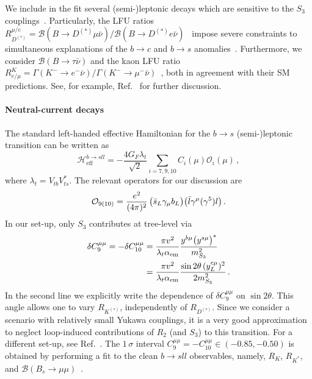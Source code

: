 \documentclass[aps,prd,superscriptaddress,twocolumn,secnumarabic]{revtex4-1}
\begin{document}
We include in the fit several (semi-)leptonic decays which are sensitive to the $S_3$ couplings~\cite{Dorsner:2017ufx}. Particularly, the LFU ratios $R_{D^{(\ast)}}^{\mu/e} = \mathcal{B}(B\to D^{(\ast)}\mu \bar{\nu})/\mathcal{B}(B\to D^{(\ast)} e \bar{\nu})$~\cite{Glattauer:2015teq,Abdesselam:2017kjf} impose severe constraints to simultaneous explanations of the $b\to c$ and $b\to s$ anomalies~\cite{Becirevic:2016oho}. Furthermore, we consider $\mathcal{B}(B\to \tau \bar{\nu})$ and the kaon LFU ratio $R^K_{e/\mu}= \Gamma(K^-\to e^- \bar{\nu})/\Gamma(K^-\to \mu^- \bar{\nu})$~\cite{Cirigliano:2007xi}, both in agreement with their SM predictions. See, for example, Ref.~\cite{Dorsner:2017ufx} for further discussion.

\paragraph*{Neutral-current decays} The standard left-handed effective Hamiltonian for the $b\to s$ (semi-)leptonic transition can be written as
\begin{equation}
\mathcal{H}^{b\to s l l}_{\mathrm{eff}} = -\dfrac{4 G_F \lambda_t }{\sqrt{2}}  \sum_{i=7,9,10} C_i(\mu)\mathcal{O}_i(\mu)\,,
\end{equation}
where $\lambda_t = V_{tb}V_{ts}^\ast$. The relevant operators for our discussion are
\begin{equation}
  \mathcal{O}_{9(10)} = \dfrac{e^2}{(4\pi)^2} \,\big{(}\bar{s}_L\gamma_\mu  b_L\big{)} \big{(}\bar{l}\gamma^\mu (\gamma^5)l \big{)}\,.
\end{equation}
In our set-up, only $S_3$ contributes at tree-level via~\cite{Dorsner:2017ufx}
%
\begin{equation}
\begin{split}
  \delta C_9^{\mu\mu} = - \delta C_{10}^{\mu\mu} &= \dfrac{\pi v^2}{ \lambda_t \alpha_{\mathrm{em}}} \dfrac{y^{b\mu} \big{(}y^{s\mu}\big{)}^\ast}{m_{S_3}^2}\\
  &=\dfrac{\pi v^2}{ \lambda_t \alpha_{\mathrm{em}}} \frac{\sin 2\theta\, (y_L^{c\mu})^2}{2 m_{S_3}^2}\,.
\end{split}
\end{equation}
%
In the second line we explicitly write the dependence of $\delta C_9^{\mu\mu}$ on $\sin 2\theta$. This angle allows one to vary $R_{K^{(*)}}$, independently of $R_{D^{(*)}}$. Since we consider a scenario with relatively small Yukawa couplings, it is a very good approximation to neglect loop-induced contributions of $R_2$ (and $S_3$) to this transition. For a different set-up, see Ref.~\cite{Becirevic:2017jtw}. The $1\,\sigma$ interval  $C_9^{\mu\mu}=-C_{10}^{\mu\mu} \in (-0.85,-0.50)$ is obtained by performing a fit to the clean $b\to s l l$ observables, namely, $R_K$, $R_{K^{\ast}}$, and $\mathcal{B}(B_s\to \mu\mu)$~\cite{DAmico:2017mtc,Capdevila:2017bsm}.
\end{document}

